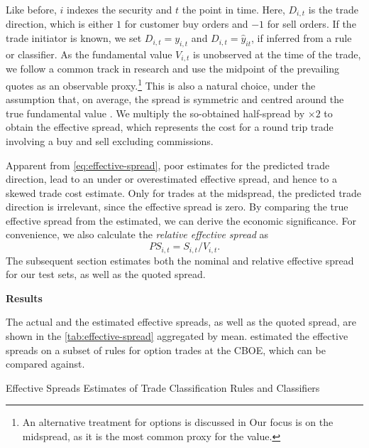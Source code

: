 Like before, $i$ indexes the security and $t$ the point in time. Here, $D_{i,t}$ is the trade direction, which is either $1$ for customer buy orders and $-1$ for sell orders. If the trade initiator is known, we set $D_{i,t} = y_{i,t}$ and $D_{i,t}=\hat{y}_{it}$, if inferred from a rule or classifier. As the fundamental value $V_{i,t}$ is unobserved at the time of the trade, we follow a common track in research and use the midpoint of the prevailing quotes as an observable proxy.\footnote{An alternative treatment for options is discussed in \textcite[][4975--4976]{muravyevOptionsTradingCosts2020} Our focus is on the midspread, as it is the most common proxy for the value.} This is also a natural choice, under the assumption that, on average, the spread is symmetric and centred around the true fundamental value \autocite[][1018]{leeMarketIntegrationPrice1993}. We multiply the so-obtained half-spread by $\times 2$ to obtain the effective spread, which represents the cost for a round trip trade involving a buy and sell excluding commissions.

Apparent from \cref{eq:effective-spread}, poor estimates for the predicted trade direction, lead to an under or overestimated effective spread, and hence to a skewed trade cost estimate. Only for trades at the midspread, the predicted trade direction is irrelevant, since the effective spread is zero. By comparing the true effective spread from the estimated, we can derive the economic significance. For convenience, we also calculate the \emph{relative effective spread} as
\begin{equation}
    {PS}_{i,t} = S_{i,t} / V_{i,t}.
\end{equation}
The subsequent section estimates both the nominal and relative effective spread for our test sets, as well as the quoted spread.

\textbf{Results}

The actual and the estimated effective spreads, as well as the quoted spread, are shown in the \cref{tab:effective-spread} aggregated by mean. \textcite[][896--897]{savickasInferringDirectionOption2003} estimated the effective spreads on a subset of rules for option trades at the \gls{CBOE}, which can be compared against.

\begin{table}[H]
    \centering
    
    \caption{Effective Spreads Estimates of Trade Classification Rules and Classifiers}
    \label{tab:effective-spread}
\end{table}


